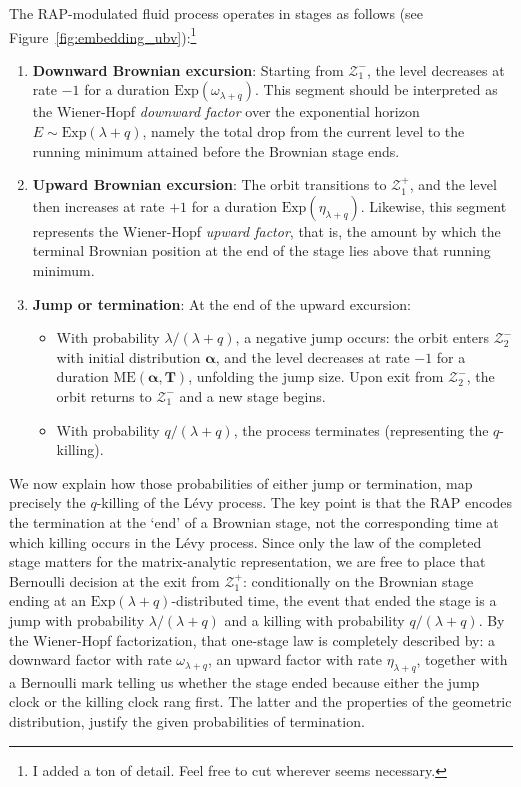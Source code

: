 \documentclass[a4paper,11pt]{article}
\numberwithin{equation}{section}
\theoremstyle{plain}
\theoremstyle{definition}
\newcommand{\1}{\mathbf{1}}
\begin{document}
The RAP-modulated fluid process operates in stages as follows (see Figure~\ref{fig:embedding_ubv}):\footnote{I added a ton of detail. Feel free to cut wherever seems necessary.}
\begin{enumerate}
\item \textbf{Downward Brownian excursion}: Starting from $\mathcal{Z}_1^-$, the level decreases at rate $-1$ for a duration $\mathrm{Exp}(\omega_{\lambda+q})$. 
This segment should be interpreted as the Wiener-Hopf \emph{downward factor} over the exponential horizon $E\sim\mathrm{Exp}(\lambda+q)$, namely the total drop from the current level to the running minimum attained before the Brownian stage ends. 
\item \textbf{Upward Brownian excursion}: The orbit transitions to $\mathcal{Z}_1^+$, and the level then increases at rate $+1$ for a duration $\mathrm{Exp}(\eta_{\lambda+q})$.
Likewise, this segment represents the Wiener-Hopf \emph{upward factor}, that is, the amount by which the terminal Brownian position at the end of the stage lies above that running minimum. 
\item \textbf{Jump or termination}: At the end of the upward excursion:
\begin{itemize}
\item With probability $\lambda/(\lambda + q)$, a negative jump occurs: the orbit enters $\mathcal{Z}_2^-$ with initial distribution $\bm{\alpha}$, and the level decreases at rate $-1$ for a duration $\mathrm{ME}(\bm{\alpha}, \bm{T})$, unfolding the jump size. Upon exit from $\mathcal{Z}_2^-$, the orbit returns to $\mathcal{Z}_1^-$ and a new stage begins.
\item With probability $q/(\lambda + q)$, the process terminates (representing the $q$-killing).
\end{itemize}
\end{enumerate}

We now explain how those probabilities of either jump or termination, map precisely the $q$-killing of the L\'evy process.
The key point is that the RAP encodes the termination at the `end' of a Brownian stage, not the corresponding time at which killing occurs in the L\'evy process. 
Since only the law of the completed stage matters for the matrix-analytic representation, we are free to place that Bernoulli decision at the exit from $\mathcal{Z}_1^+$: conditionally on the Brownian stage ending at an $\mathrm{Exp}(\lambda+q)$-distributed time, the event that ended the stage is a jump with probability $\lambda/(\lambda+q)$ and a killing with probability $q/(\lambda+q)$.
By the Wiener-Hopf factorization, that one-stage law is completely described by: a downward factor with rate $\omega_{\lambda+q}$,  an upward factor with rate $\eta_{\lambda+q}$, together with a Bernoulli mark telling us whether the stage ended because either the jump clock or the killing clock rang first. 
The latter and the properties of the geometric distribution, justify the given probabilities of termination.
\end{document}
